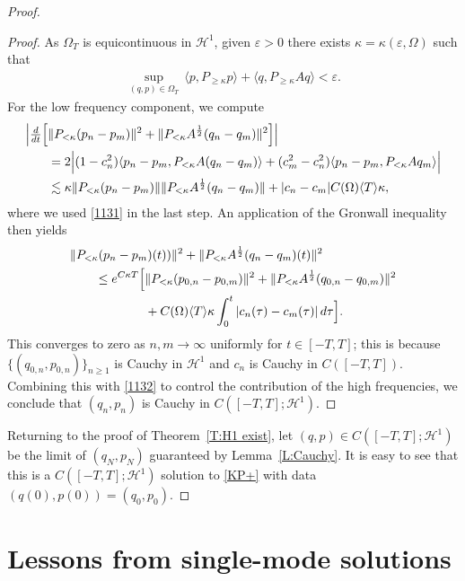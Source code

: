 \documentclass{amsart}
\newcommand{\eps}{\varepsilon}
\theoremstyle{definition}
\numberwithin{equation}{section}
\renewcommand{\H}{\mathcal H}
\newcommand{\la}{\langle}
\newcommand{\ra}{\rangle}
\begin{document}
\begin{proof}
\begin{proof}
As $\Omega_T$ is equicontinuous in $\H^1$, given $\eps>0$ there exists $\kappa=\kappa(\eps, \Omega)$ such that
\begin{align}\label{1132}
\sup_{(q,p)\in \Omega_T} \, \la p, P_{\geq \kappa} p\ra + \la q, P_{\geq \kappa} A q\ra <\eps.
\end{align}
For the low frequency component, we compute
\begin{align*}
\Bigl|\tfrac{d}{dt} \Bigl[&\|P_{<\kappa}(p_n-p_m)\|^2+ \|P_{<\kappa}A^{\frac12}(q_n-q_m)\|^2\Bigr]\Bigr|\\
&=2\Bigl|(1- c_n^2) \la p_n-p_m, P_{<\kappa} A (q_n-q_m)\ra + (c_m^2-c_n^2)\la p_n-p_m, P_{<\kappa}A q_m\ra\Bigr|\\
&\lesssim \kappa \|P_{<\kappa}(p_n-p_m)\| \|P_{<\kappa} A^{\frac12}(q_n-q_m)\| + |c_n-c_m| C(\Omega)\la T\ra \kappa, 
\end{align*}
where we used \eqref{1131} in the last step.  An application of the Gronwall inequality then yields
\begin{align*}
&\|P_{<\kappa}(p_n-p_m)(t))\|^2 + \|P_{<\kappa}A^{\frac12}(q_n-q_m)(t)\|^2\\
&\qquad\leq e^{C\kappa T}\Bigl[ \|P_{<\kappa}(p_{0,n}-p_{0,m})\|^2+ \|P_{<\kappa}A^{\frac12}(q_{0,n}-q_{0,m})\|^2\\
&\qquad\qquad\qquad  +C(\Omega)\la T\ra \kappa\int_0^t|c_n(\tau)-c_m(\tau)|\, d\tau \Bigr].
\end{align*}
This converges to zero as $n,m\to \infty$ uniformly for $t\in [-T,T]$; this is because $\{(q_{0,n}, p_{0,n})\}_{n\geq 1}$ is Cauchy in $\H^1$ and $c_n$ is Cauchy in $C([-T,T])$.  Combining this with \eqref{1132} to control the contribution of the high frequencies, we conclude that $(q_n, p_n)$ is Cauchy in $C([-T,T];\H^1)$.
\end{proof}

Returning to the proof of Theorem~\ref{T:H1 exist}, let $(q,p)\in C([-T,T]; \H^1)$ be the limit of $(q_N, p_N)$ guaranteed by  Lemma~\ref{L:Cauchy}. It is easy to see that this is a $C([-T,T]; \H^1)$ solution to \eqref{KP+} with data $(q(0),p(0))=(q_0,p_0)$.
\end{proof}



\section{Lessons from single-mode solutions}\label{S:7}
\end{document}
